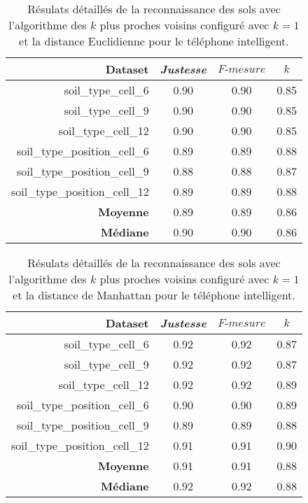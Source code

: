 \begin{table}[H]\renewcommand{\arraystretch}{0.5}
	\centering
	\caption{Résulats détaillés de la reconnaissance des sols avec l'algorithme des $k$ plus proches voisins configuré avec $k=1$ et la distance Euclidienne pour le téléphone intelligent.}
	\label{tab:tab:knn-dE-cell}
	\begin{tabular}{@{}rccc@{}}
		\toprule
			\textbf{Dataset} & \textit{Justesse} & $F\mbox{-} mesure$ & \textbf{$k$} \\
		\midrule
			soil\_type\_cell\_6 & 0.90 & 0.90 & 0.85 \\
			soil\_type\_cell\_9 & 0.90 & 0.90 & 0.85 \\
			soil\_type\_cell\_12 & 0.90 & 0.90 & 0.85 \\
			soil\_type\_position\_cell\_6 & 0.89 & 0.89 & 0.88 \\
			soil\_type\_position\_cell\_9 & 0.88 & 0.88 & 0.87 \\
			soil\_type\_position\_cell\_12 & 0.89 & 0.89 & 0.88 \\
			\textbf{Moyenne} & 0.89 & 0.89 & 0.86 \\
			\textbf{Médiane} & 0.90 & 0.90 & 0.86 \\
		\bottomrule
	\end{tabular}
\end{table}

\begin{table}[H]\renewcommand{\arraystretch}{0.5}
	\centering
	\caption{Résulats détaillés de la reconnaissance des sols avec l'algorithme des $k$ plus proches voisins configuré avec $k=1$ et la distance de Manhattan pour le téléphone intelligent.}
	\label{tab:tab:knn-dM-cell}
	\begin{tabular}{@{}rccc@{}}
		\toprule
			\textbf{Dataset} & \textit{Justesse} & $F\mbox{-} mesure$ & \textbf{$k$} \\
		\midrule
			soil\_type\_cell\_6 & 0.92 & 0.92 & 0.87 \\
			soil\_type\_cell\_9 & 0.92 & 0.92 & 0.87 \\
			soil\_type\_cell\_12 & 0.92 & 0.92 & 0.89 \\
			soil\_type\_position\_cell\_6 & 0.90 & 0.90 & 0.89 \\
			soil\_type\_position\_cell\_9 & 0.89 & 0.89 & 0.88 \\
			soil\_type\_position\_cell\_12 & 0.91 & 0.91 & 0.90 \\
			\textbf{Moyenne} & 0.91 & 0.91 & 0.88 \\
			\textbf{Médiane} & 0.92 & 0.92 & 0.88 \\
		\bottomrule
	\end{tabular}
\end{table}